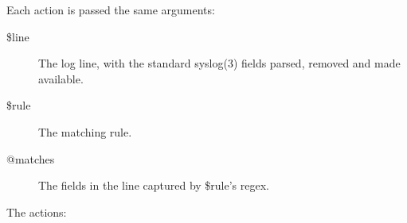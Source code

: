 \documentclass[a4paper,12pt,draft]{article}
\begin{document}
\label{actions-in-detail}

Each action is passed the same arguments: 

\begin{description}

    \item [\$line] The log line, with the standard syslog(3) fields parsed,
        removed and made available.
        
    \item [\$rule] The matching rule.
        
    \item [@matches] The fields in the line captured by \$rule's regex.

\end{description}

The actions:
\end{document}
